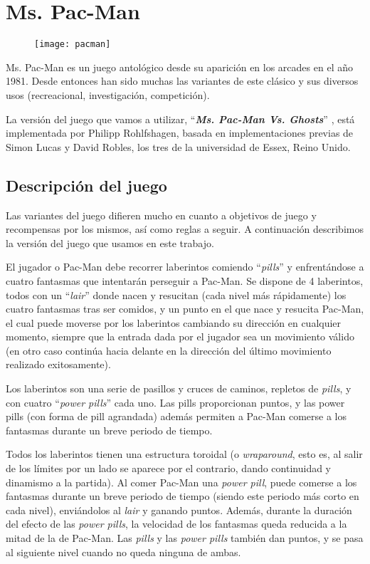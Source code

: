 \chapter{Ms. Pac-Man} \label{cap:ms-pacman}
\begin{figure}[H]
\centering
\texttt{[image: pacman]}
\end{figure}

Ms. Pac-Man es un juego antológico desde su aparición en los arcades en el año 1981. Desde entonces han sido muchas las variantes de este clásico y sus diversos usos (recreacional, investigación, competición).
 
La versión del juego que vamos a utilizar, ``\textbf{\textit{Ms. Pac-Man Vs. Ghosts}}'' \cite{pacmanvsghostsTournamentPage} \cite{pacmanvsghostsGit}, está implementada por Philipp Rohlfshagen, basada en implementaciones previas de Simon Lucas y David Robles, los tres de la universidad de Essex, Reino Unido.


\section{Descripción del juego}
Las variantes del juego difieren mucho en cuanto a objetivos de juego y recompensas por los mismos, así como reglas a seguir. A continuación describimos la versión del juego que usamos en este trabajo.

El jugador o Pac-Man debe recorrer laberintos comiendo ``\textit{pills}'' y enfrentándose a cuatro fantasmas que intentarán perseguir a Pac-Man. Se dispone de 4 laberintos, todos con un ``\textit{lair}'' donde nacen y resucitan (cada nivel más rápidamente) los cuatro fantasmas tras ser comidos, y un punto en el que nace y resucita Pac-Man, el cual puede moverse por los laberintos cambiando su dirección en cualquier momento, siempre que la entrada dada por el jugador sea un movimiento válido (en otro caso continúa hacia delante en la dirección del último movimiento realizado exitosamente).
 
\blankline

Los laberintos son una serie de pasillos y cruces de caminos, repletos de \textit{pills}, y con cuatro ``\textit{power pills}'' cada uno. Las pills proporcionan puntos, y las power pills (con forma de pill agrandada) además permiten a Pac-Man comerse a los fantasmas durante un breve periodo de tiempo.

Todos los laberintos tienen una estructura toroidal (o \textit{wraparound}, esto es, al salir de los límites por un lado se aparece por el contrario, dando continuidad y dinamismo a la partida). Al comer Pac-Man una \textit{power pill}, puede comerse a los fantasmas durante un breve periodo de tiempo (siendo este periodo más corto en cada nivel), enviándolos al \textit{lair} y ganando puntos. Además, durante la duración del efecto de las \textit{power pills}, la velocidad de los fantasmas queda reducida a la mitad de la de Pac-Man. Las \textit{pills} y las \textit{power pills} también dan puntos, y se pasa al siguiente nivel cuando no queda ninguna de ambas.
 
